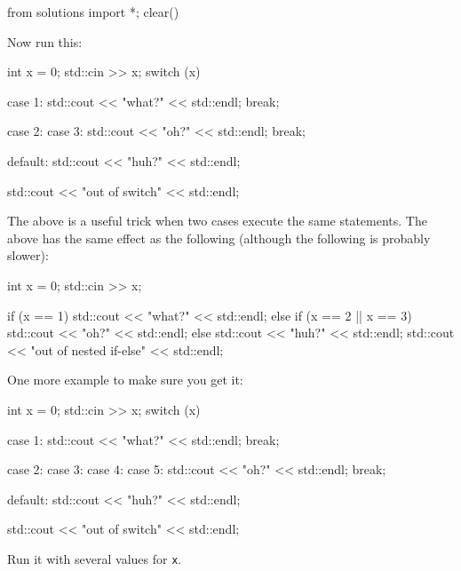 \begin{python0}
from solutions import *; clear()
\end{python0}

Now run this:
\begin{console}
int x = 0;
std::cin >> x;
switch (x)
{
     case 1:
        std::cout << "what?" << std::endl;
        break;
        
     case 2:
     case 3:
        std::cout << "oh?" << std::endl;
        break;
        
     default:
        std::cout << "huh?" << std::endl;
}
std::cout << "out of switch" << std::endl;
\end{console}
The above is a useful trick when two cases execute the same statements.
The above has the same effect as the following (although the following
is probably slower):
\begin{console}
int x = 0;
std::cin >> x;

if (x == 1)
{
     std::cout << "what?" << std::endl;
}
else if (x == 2 || x == 3)
{
     std::cout << "oh?" << std::endl;
}
else
{
     std::cout << "huh?" << std::endl;
}
std::cout << "out of nested if-else" << std::endl;
\end{console}
One more example to make sure you get it:
\begin{console}
int x = 0;
std::cin >> x;
switch (x)
{
     case 1:
          std::cout << "what?" << std::endl;
          break;
          
     case 2:
     case 3:
     case 4:
     case 5:
          std::cout << "oh?" << std::endl;
          break;
          
     default:
          std::cout << "huh?" << std::endl;
}
std::cout << "out of switch" << std::endl;
\end{console}
Run it with several values for \texttt{x}.

